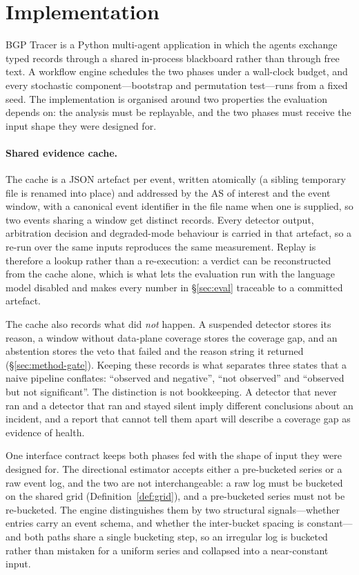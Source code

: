 \section{Implementation}
\label{sec:impl}

BGP Tracer is a Python multi-agent application in which the agents
exchange typed records through a shared in-process blackboard rather
than through free text. A workflow engine schedules the two phases under
a wall-clock budget, and every stochastic component---bootstrap and
permutation test---runs from a fixed seed. The implementation is
organised around two properties the evaluation depends on: the analysis
must be replayable, and the two phases must receive the input shape they
were designed for.

\paragraph{Shared evidence cache.}
The cache is a JSON artefact per event, written atomically (a sibling
temporary file is renamed into place) and addressed by the AS of interest
and the event window, with a canonical event identifier in the file name
when one is supplied, so two events sharing a window get distinct records.
Every detector output, arbitration decision and degraded-mode behaviour
is carried in that artefact, so a re-run over the same inputs reproduces
the same measurement. Replay is therefore a lookup rather than a
re-execution: a verdict can be reconstructed from the cache alone, which
is what lets the evaluation run with the language model disabled and makes
every number in \S\ref{sec:eval} traceable to a committed artefact.

The cache also records what did \emph{not} happen. A suspended detector
stores its reason, a window without data-plane coverage stores the
coverage gap, and an abstention stores the veto that failed and the
reason string it returned (\S\ref{sec:method-gate}). Keeping these records
is what separates three states that a naive pipeline conflates: ``observed
and negative'', ``not observed'' and ``observed but not significant''. The
distinction is not bookkeeping. A detector that never ran and a detector
that ran and stayed silent imply different conclusions about an incident,
and a report that cannot tell them apart will describe a coverage gap as
evidence of health.

\label{sec:impl-contract}
One interface contract keeps both phases fed with the shape of input they
were designed for. The directional estimator accepts either a
pre-bucketed series or a raw event log, and the two are not
interchangeable: a raw log must be bucketed on the shared grid
(Definition~\ref{def:grid}), and a pre-bucketed series must not be
re-bucketed. The engine distinguishes them by two structural
signals---whether entries carry an event schema, and whether the
inter-bucket spacing is constant---and both paths share a single
bucketing step, so an irregular log is bucketed rather than mistaken for
a uniform series and collapsed into a near-constant input.

